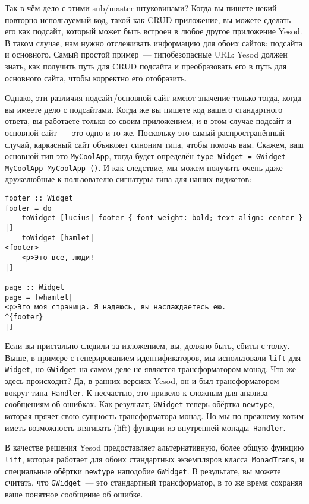 Так в чём дело с этими sub/master штуковинами? Когда вы пишете некий повторно
используемый код, такой как CRUD приложение, вы можете сделать его как подсайт,
который может быть встроен в любое другое приложение Yesod. В таком случае, нам
нужно отслеживать информацию для обоих сайтов: подсайта и основного. Самый
простой пример~--- типобезопасные URL: Yesod должен знать, как получить путь
для CRUD подсайта и преобразовать его в путь для основного сайта, чтобы
корректно его отобразить.

Однако, эти различия подсайт/основной сайт имеют значение только тогда, когда
вы имеете дело с подсайтами. Когда же вы пишете код вашего стандартного ответа,
вы работаете только со своим приложением, и в этом случае подсайт и основной
сайт~--- это одно и то же. Поскольку это самый распространённый случай,
каркасный сайт объявляет синоним типа, чтобы помочь вам. Скажем, ваш основной
тип это \lstinline'MyCoolApp', тогда будет определён
\lstinline'type Widget = GWidget MyCoolApp MyCoolApp ()'.
И как следствие, мы можем получить очень даже дружелюбные к пользователю
сигнатуры типа для наших виджетов:
\begin{lstlisting}
footer :: Widget
footer = do
    toWidget [lucius| footer { font-weight: bold; text-align: center } |]
    toWidget [hamlet|
<footer>
    <p>Это все, люди!
|]

page :: Widget
page = [whamlet|
<p>Это моя страница. Я надеюсь, вы наслаждаетесь ею.
^{footer}
|]
\end{lstlisting}

Если вы пристально следили за изложением, вы, должно быть, сбиты с толку. Выше,
в примере с генерированием идентификаторов, мы использовали \lstinline'lift'
для \lstinline'Widget', но \lstinline'GWidget' на самом деле не является
трансформатором монад. Что же здесь происходит? Да, в ранних версиях Yesod,
он и был трансформатором вокруг типа~\lstinline'Handler'. К несчастью, это
привело к сложным для анализа сообщениям об ошибках. Как результат,
\lstinline'GWidget' теперь обёртка \lstinline'newtype', которая прячет свою
сущность трансформатора монад. Но мы по-прежнему хотим иметь возможность
втягивать (lift) функции из внутренней монады~\lstinline'Handler'.

В качестве решения Yesod предоставляет альтернативную, более общую функцию
\lstinline'lift', которая работает для обоих стандартных экземпляров
класса~\lstinline'MonadTrans', и специальные обёртки \lstinline'newtype'
наподобие \lstinline'GWidget'.  В результате, вы можете считать, что
\lstinline'GWidget'~--- это стандартный трансформатор, в то же время сохраняя
ваше понятное сообщение об ошибке.

